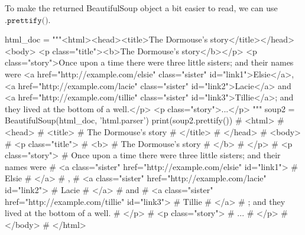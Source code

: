 \documentclass[a4paper, 12pt]{report}
\theoremstyle{remark}
\theoremstyle{definition}
\begin{document}
To make the returned BeautifulSoup object a bit easier to read, we can use $\texttt{.prettify()}$. 
\begin{python}
html_doc = 
"""<html><head><title>The Dormouse's story</title></head>
<body>
<p class="title"><b>The Dormouse's story</b></p>
<p class="story">Once upon a time there were three little sisters; and their names were
<a href="http://example.com/elsie" class="sister" id="link1">Elsie</a>,
<a href="http://example.com/lacie" class="sister" id="link2">Lacie</a> and
<a href="http://example.com/tillie" class="sister" id="link3">Tillie</a>;
and they lived at the bottom of a well.</p>
<p class="story">...</p>
"""
soup2 = BeautifulSoup(html_doc, 'html.parser')
print(soup2.prettify())
# <html>
#  <head>
#   <title>
#    The Dormouse's story
#   </title>
#  </head>
#  <body>
#   <p class="title">
#    <b>
#     The Dormouse's story
#    </b>
#   </p>
#   <p class="story">
#    Once upon a time there were three little sisters; and their names were
#    <a class="sister" href="http://example.com/elsie" id="link1">
#     Elsie
#    </a>
#    ,
#    <a class="sister" href="http://example.com/lacie" id="link2">
#     Lacie
#    </a>
#    and
#    <a class="sister" href="http://example.com/tillie" id="link3">
#     Tillie
#    </a>
#    ; and they lived at the bottom of a well.
#   </p>
#   <p class="story">
#    ...
#   </p>
#  </body>
# </html>
\end{python}
\end{document}
